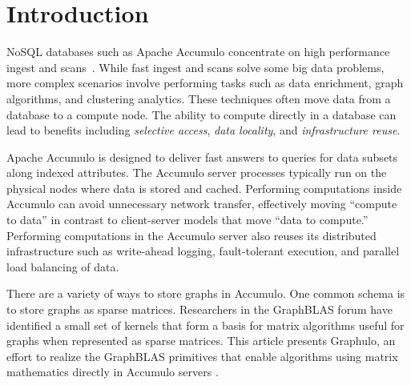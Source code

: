 
\section{Introduction}
\label{sIntro}
% 


NoSQL databases such as Apache Accumulo
concentrate on high performance ingest and scans~\cite{sen2013benchmarking}. 
While fast ingest and scans solve some big data problems,
more complex scenarios involve performing tasks
such as data enrichment, graph algorithms, and clustering analytics. These techniques
often move data from a database %
to a compute node. The ability to
compute directly in a database can lead to benefits including 
\emph{selective access}, \emph{data locality}, and \emph{infrastructure reuse}. 

Apache Accumulo is designed to deliver
fast answers to queries for data subsets along indexed attributes. 
The Accumulo server processes typically run on the physical nodes where data is stored and cached.
Performing computations inside Accumulo can avoid unnecessary network transfer,
effectively moving ``compute to data''
in contrast to client-server models that move ``data to compute.''
Performing computations in the Accumulo server also reuses its distributed infrastructure
such as write-ahead logging, fault-tolerant execution, and 
parallel load balancing of data.

There are a variety of ways to store graphs in Accumulo.  One common schema is
to store graphs as sparse matrices.  
Researchers in the GraphBLAS forum \cite{mattson2014standards} 
have identified a small set of kernels
that form a basis for matrix algorithms useful for graphs
when represented as sparse matrices.
This article presents Graphulo, an effort to realize the GraphBLAS primitives 
that enable algorithms using matrix mathematics directly in Accumulo servers \cite{gadepally2015gabb}.

